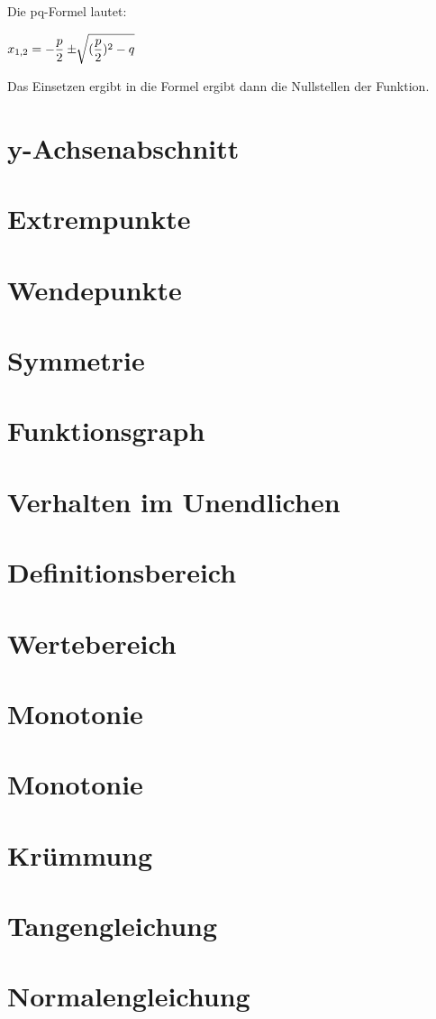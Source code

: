 \documentclass[10pt,a4paper]{article}
\begin{document}
Die pq-Formel lautet: \newline

$\mathlarger{x_{1,2} = -\frac{p}{2} \pm \sqrt[]{(\frac{p}{2})^2 - q}}$

Das Einsetzen ergibt in die Formel ergibt dann die Nullstellen der Funktion.

\section*{y-Achsenabschnitt}

\section*{Extrempunkte}

\section*{Wendepunkte}

\section*{Symmetrie}

\section*{Funktionsgraph}

\section*{Verhalten im Unendlichen}

\section*{Definitionsbereich}

\section*{Wertebereich}

\section*{Monotonie}

\section*{Monotonie}

\section*{Krümmung}

\section*{Tangengleichung}

\section*{Normalengleichung}
\end{document}
